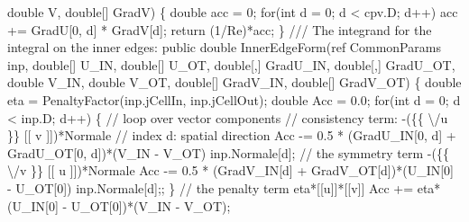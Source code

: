 {\btab \btab    double V, double[] GradV) \{               \newline 
\btab \btab double acc = 0;\newline 
\btab \btab for(int d = 0; d < cpv.D; d++)\newline 
\btab \btab \btab acc += GradU[0, d] * GradV[d];\newline 
\btab \btab return (1/Re)*acc;\newline 
\btab \}\newline 
 \newline 
 \newline 
    /// The integrand for the integral on the inner edges:
\btab public double InnerEdgeForm(ref CommonParams inp, \newline 
\btab \btab double[] U\_IN, double[] U\_OT, double[,] GradU\_IN, double[,] GradU\_OT, \newline 
\btab \btab double V\_IN, double V\_OT, double[] GradV\_IN, double[] GradV\_OT) \{\newline 
 \newline 
\btab \btab double eta = PenaltyFactor(inp.jCellIn, inp.jCellOut);\newline 
 \newline 
\btab \btab double Acc = 0.0;\newline 
\btab \btab for(int d = 0; d < inp.D; d++) \{ // loop over vector components \newline 
\btab \btab \btab // consistency term: -(\{\{ \textbackslash /u \}\} [[ v ]])*Normale\newline 
\btab \btab \btab // index d: spatial direction\newline 
\btab \btab \btab Acc -= 0.5 * (GradU\_IN[0, d] + GradU\_OT[0, d])*(V\_IN - V\_OT)\newline 
\btab \btab \btab \btab \btab    * inp.Normale[d];\newline 
 \newline 
\btab \btab \btab // the symmetry term -(\{\{ \textbackslash /v \}\} [[ u ]])*Normale\newline 
\btab \btab \btab Acc -= 0.5 * (GradV\_IN[d] + GradV\_OT[d])*(U\_IN[0] - U\_OT[0])\newline 
\btab \btab \btab \btab \btab    * inp.Normale[d];;\newline 
\btab \btab \}\newline 
 \newline 
\btab \btab // the penalty term eta*[[u]]*[[v]]\newline 
\btab \btab Acc += eta*(U\_IN[0] - U\_OT[0])*(V\_IN - V\_OT);\newline 
}
